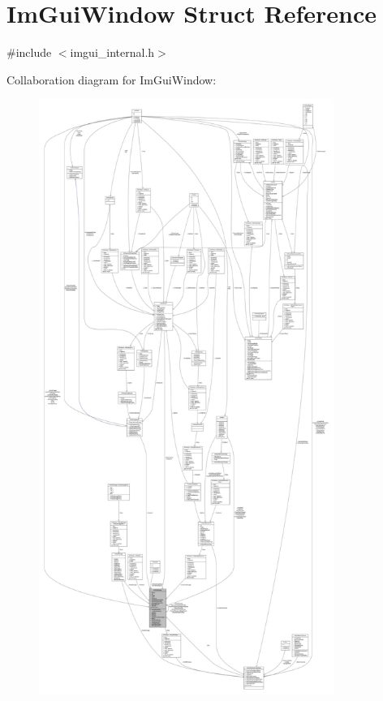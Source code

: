 \hypertarget{structImGuiWindow}{}\section{Im\+Gui\+Window Struct Reference}
\label{structImGuiWindow}


{\ttfamily \#include $<$imgui\+\_\+internal.\+h$>$}



Collaboration diagram for Im\+Gui\+Window\+:
\nopagebreak
\begin{figure}[H]
\begin{center}
\leavevmode
\includegraphics[height=550pt]{structImGuiWindow__coll__graph}
\end{center}
\end{figure}
